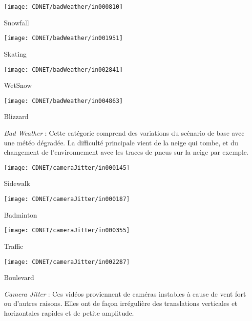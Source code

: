 	\begin{figureth}
		\begin{subfigureth}{0.24\textwidth}
			\texttt{[image: CDNET/badWeather/in000810]}\caption{Snowfall}	
		\end{subfigureth}
		\begin{subfigureth}{0.24\textwidth}
			\texttt{[image: CDNET/badWeather/in001951]}\caption{Skating}	
		\end{subfigureth}
		\begin{subfigureth}{0.24\textwidth}
			\texttt{[image: CDNET/badWeather/in002841]}\caption{WetSnow}	
		\end{subfigureth}
		\begin{subfigureth}{0.24\textwidth}
			\texttt{[image: CDNET/badWeather/in004863]}\caption{Blizzard}	
		\end{subfigureth}
		\caption[Catégorie Bad Weather]{\textit{Bad Weather} : Cette catégorie comprend des variations du scénario de base avec une météo dégradée. La difficulté principale vient de la neige qui tombe, et du changement de l'environnement avec les traces de pneus sur la neige par exemple.}\label{fig:cdnet:badweather}
	\end{figureth}

	\begin{figureth}
		\begin{subfigureth}{0.24\textwidth}
			\texttt{[image: CDNET/cameraJitter/in000145]}\caption{Sidewalk}	
		\end{subfigureth}
		\begin{subfigureth}{0.24\textwidth}
			\texttt{[image: CDNET/cameraJitter/in000187]}\caption{Badminton}	
		\end{subfigureth}
		\begin{subfigureth}{0.24\textwidth}
			\texttt{[image: CDNET/cameraJitter/in000355]}\caption{Traffic}	
		\end{subfigureth}
		\begin{subfigureth}{0.24\textwidth}
			\texttt{[image: CDNET/cameraJitter/in002287]}\caption{Boulevard}	
		\end{subfigureth}
		\caption[Catégorie Camera Jitter]{\textit{Camera Jitter} : Ces vidéos proviennent de caméras instables à cause de vent fort ou d'autres raisons. Elles ont de façon irrégulière des translations verticales et horizontales  rapides et de petite amplitude.}\label{fig:cdnet:jitter}
	\end{figureth}

